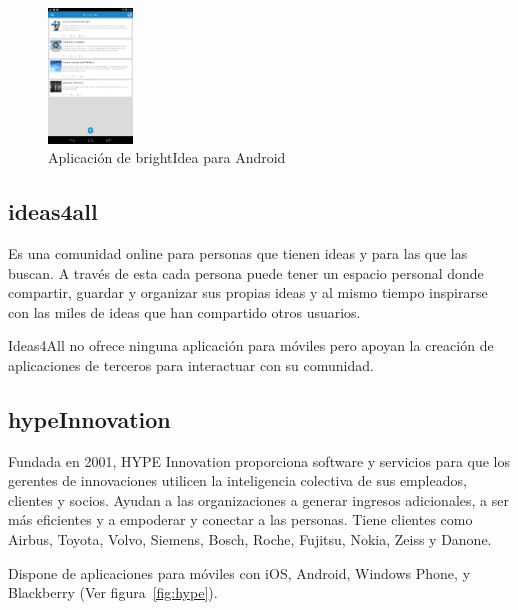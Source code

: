 \begin{figure}[!h]
\begin{center}
		\includegraphics[width=0.2\textwidth]{./img/competencia/brightIdea/6.png}
		\caption{Aplicación de brightIdea para Android}
		\label{fig:brightIdea}
	\end{center}
\end{figure}

\subsection{ideas4all}

Es una comunidad online para personas que tienen ideas y para las que las buscan. A través de esta cada persona puede tener un espacio personal donde compartir, guardar y organizar sus propias ideas y al mismo tiempo inspirarse con las miles de ideas que han compartido otros usuarios.

Ideas4All no ofrece ninguna aplicación para móviles pero apoyan la creación de aplicaciones de terceros 
para interactuar con su comunidad.


\subsection{hypeInnovation}

Fundada en 2001, HYPE Innovation proporciona software y servicios para que los gerentes de innovaciones utilicen la inteligencia colectiva de sus empleados, clientes y socios. Ayudan a las organizaciones a generar ingresos adicionales, a ser más eficientes y a empoderar y conectar a las personas. Tiene clientes como Airbus, Toyota, Volvo, Siemens, Bosch, Roche, Fujitsu, Nokia, Zeiss y Danone.

Dispone de aplicaciones para móviles con iOS, Android, Windows Phone, y Blackberry (Ver figura~\ref{fig:hype}).

